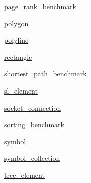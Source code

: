 \begin{DoxyCompactItemize}
\item 
 \mbox{\hyperlink{namespacebridges_1_1page__rank__benchmark}{page\+\_\+rank\+\_\+benchmark}}
\item 
 \mbox{\hyperlink{namespacebridges_1_1polygon}{polygon}}
\item 
 \mbox{\hyperlink{namespacebridges_1_1polyline}{polyline}}
\item 
 \mbox{\hyperlink{namespacebridges_1_1rectangle}{rectangle}}
\item 
 \mbox{\hyperlink{namespacebridges_1_1shortest__path__benchmark}{shortest\+\_\+path\+\_\+benchmark}}
\item 
 \mbox{\hyperlink{namespacebridges_1_1sl__element}{sl\+\_\+element}}
\item 
 \mbox{\hyperlink{namespacebridges_1_1socket__connection}{socket\+\_\+connection}}
\item 
 \mbox{\hyperlink{namespacebridges_1_1sorting__benchmark}{sorting\+\_\+benchmark}}
\item 
 \mbox{\hyperlink{namespacebridges_1_1symbol}{symbol}}
\item 
 \mbox{\hyperlink{namespacebridges_1_1symbol__collection}{symbol\+\_\+collection}}
\item 
 \mbox{\hyperlink{namespacebridges_1_1tree__element}{tree\+\_\+element}}
\end{DoxyCompactItemize}
